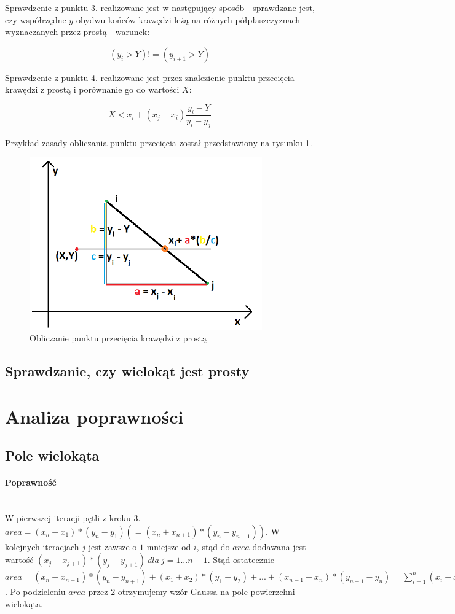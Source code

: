 \documentclass{article}
\begin{document}
Sprawdzenie z punktu 3. realizowane jest w następujący sposób - sprawdzane jest, czy współrzędne \(y\) obydwu końców krawędzi leżą na różnych półpłaszczyznach wyznaczanych przez prostą - warunek:

$$(y_i > Y) != (y_{i+1} > Y)$$

Sprawdzenie z punktu 4. realizowane jest przez znalezienie punktu przecięcia krawędzi z prostą i porównanie go do wartości \(X\):

$$X < x_i + (x_j - x_i)\frac{y_i - Y}{y_i - y_j}$$

Przykład zasady obliczania punktu przecięcia został przedstawiony na rysunku \ref{fig:przeciecie}.

\begin{figure}[H]
    \centering
    \includegraphics[width=10cm]{przeciecie.png}
    \caption{Obliczanie punktu przecięcia krawędzi z prostą}
    \label{fig:przeciecie}
\end{figure}

\subsection{Sprawdzanie, czy wielokąt jest prosty}



\section{Analiza poprawności}

\subsection{Pole wielokąta}
\paragraph{Poprawność} \mbox{}\\
W pierwszej iteracji pętli z kroku 3. \(area = (x_n+x_1)*(y_n-y_1) (=(x_n+x_{n+1})*(y_n-y_{n+1}))\). W kolejnych iteracjach \(j\) jest zawsze o \(1\) mniejsze od \(i\), stąd do \(area\) dodawana jest wartość \((x_j+x_{j+1})*(y_j-y_{j+1})\ dla\ j = 1...n-1\). Stąd ostatecznie \(area = (x_n+x_{n+1})*(y_n-y_{n+1}) + (x_1+x_2)*(y_1-y_2) + ... + (x_{n-1}+x_n)*(y_{n-1}-y_{n}) = \sum\limits_{i=1}^n (x_i+x_{i+1})*(y_{i+1}-y_i)\). Po podzieleniu \(area\) przez \(2\) otrzymujemy wzór Gaussa na pole powierzchni wielokąta.
\end{document}
